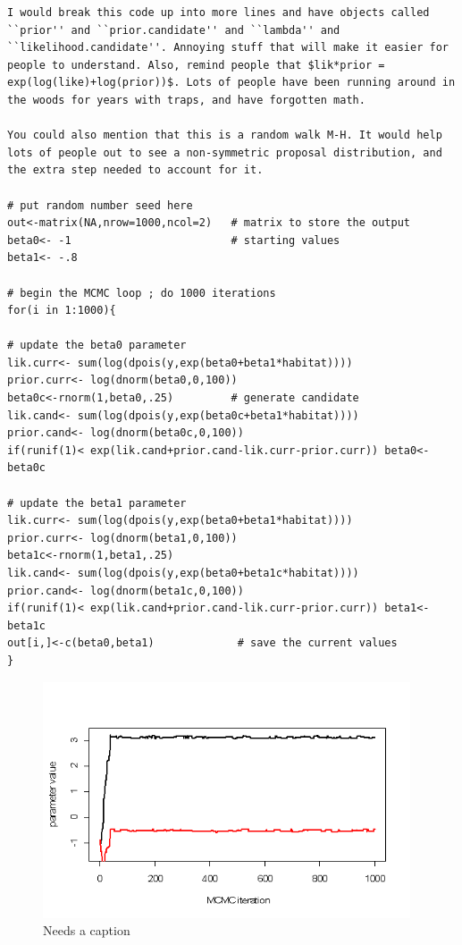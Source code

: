 
\begin{verbatim}I would break this code up into more lines and have objects called ``prior'' and ``prior.candidate'' and ``lambda'' and ``likelihood.candidate''. Annoying stuff that will make it easier for people to understand. Also, remind people that $lik*prior = exp(log(like)+log(prior))$. Lots of people have been running around in the woods for years with traps, and have forgotten math.

You could also mention that this is a random walk M-H. It would help lots of people out to see a non-symmetric proposal distribution, and the extra step needed to account for it.

# put random number seed here
out<-matrix(NA,nrow=1000,ncol=2)   # matrix to store the output
beta0<- -1                         # starting values
beta1<- -.8

# begin the MCMC loop ; do 1000 iterations
for(i in 1:1000){

# update the beta0 parameter
lik.curr<- sum(log(dpois(y,exp(beta0+beta1*habitat)))) 
prior.curr<- log(dnorm(beta0,0,100))
beta0c<-rnorm(1,beta0,.25)         # generate candidate
lik.cand<- sum(log(dpois(y,exp(beta0c+beta1*habitat))))
prior.cand<- log(dnorm(beta0c,0,100))
if(runif(1)< exp(lik.cand+prior.cand-lik.curr-prior.curr)) beta0<-beta0c

# update the beta1 parameter
lik.curr<- sum(log(dpois(y,exp(beta0+beta1*habitat)))) 
prior.curr<- log(dnorm(beta1,0,100))
beta1c<-rnorm(1,beta1,.25)
lik.cand<- sum(log(dpois(y,exp(beta0+beta1c*habitat)))) 
prior.cand<- log(dnorm(beta1c,0,100))
if(runif(1)< exp(lik.cand+prior.cand-lik.curr-prior.curr)) beta1<-beta1c
out[i,]<-c(beta0,beta1)             # save the current values
}
\end{verbatim}


\begin{figure}
\begin{center}
\includegraphics[height=2.75in]{figs/MCMC1}
\end{center}
\caption{Needs a caption}
\label{fig.MCMC1}
\end{figure}


